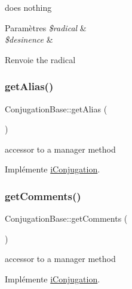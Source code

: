 does nothing


\begin{DoxyParams}{Paramètres}
{\em \$radical} & \\
\hline
{\em \$desinence} & \\
\hline
\end{DoxyParams}
\begin{DoxyReturn}{Renvoie}
the radical 
\end{DoxyReturn}
\hypertarget{class_conjugation_base_ac8266b933fde0f494a7933c4d2fe0590}{}\label{class_conjugation_base_ac8266b933fde0f494a7933c4d2fe0590} 
\subsubsection{\texorpdfstring{get\+Alias()}{getAlias()}}
{\footnotesize\ttfamily Conjugation\+Base\+::get\+Alias (\begin{DoxyParamCaption}{ }\end{DoxyParamCaption})}

accessor to a manager method 

Implémente \hyperlink{interfacei_conjugation_a30a8959865d6b8d3f4ae69c31792f32a}{i\+Conjugation}.

\hypertarget{class_conjugation_base_ac381d5a6d6411aba279cb56e8505bb30}{}\label{class_conjugation_base_ac381d5a6d6411aba279cb56e8505bb30} 
\subsubsection{\texorpdfstring{get\+Comments()}{getComments()}}
{\footnotesize\ttfamily Conjugation\+Base\+::get\+Comments (\begin{DoxyParamCaption}{ }\end{DoxyParamCaption})}

accessor to a manager method 

Implémente \hyperlink{interfacei_conjugation_ad887ef20e584040fe72f6e5a6212247e}{i\+Conjugation}.

\hypertarget{class_conjugation_base_a4358d211e7c70a82657e5418a554a555}{}\label{class_conjugation_base_a4358d211e7c70a82657e5418a554a555} 

